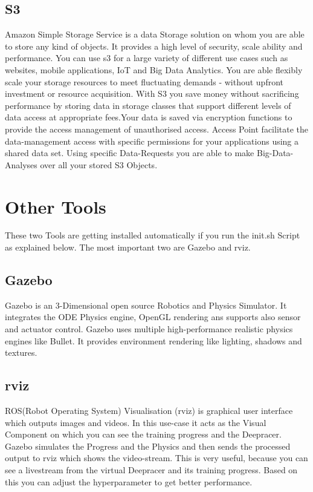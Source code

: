 \subsection{S3}
Amazon Simple Storage Service is a data Storage solution on whom you are able to store any kind of objects. It provides a high level of security, scale ability and performance. You can use s3 for a large variety of different use cases such as websites, mobile applications, IoT and Big Data Analytics. You are able flexibly scale your storage resources to meet fluctuating demands - without upfront investment or resource acquisition. With S3 you save money without sacrificing performance by storing data in storage classes that support different levels of data access at appropriate fees.Your data is saved via encryption functions to provide the access management of unauthorised access. Access Point facilitate the data-management access with specific permissions for your applications using a shared data set. Using specific Data-Requests you are able to make Big-Data-Analyses over all your stored S3 Objects.

\section{Other Tools}
These two Tools are getting installed automatically if you run the init.sh Script as explained below. The most important two are Gazebo and rviz.

\subsection{Gazebo}
Gazebo is an 3-Dimensional open source Robotics and Physics Simulator. It integrates the ODE Physics engine, OpenGL rendering ans supports also sensor and actuator control. Gazebo uses multiple high-performance realistic physics engines like Bullet. It provides environment rendering like lighting, shadows and textures. 

\subsection{rviz}
ROS(Robot Operating System) Visualisation (rviz) is graphical user interface which outputs images and videos. In this use-case it acts as the Visual Component on which you can see the training progress and the Deepracer. Gazebo simulates the Progress and the Physics and then sends the processed output to rviz which shows the video-stream. This is very useful, because you can see a livestream from the virtual Deepracer and its training progress. Based on this you can adjust the hyperparameter to get better performance.

